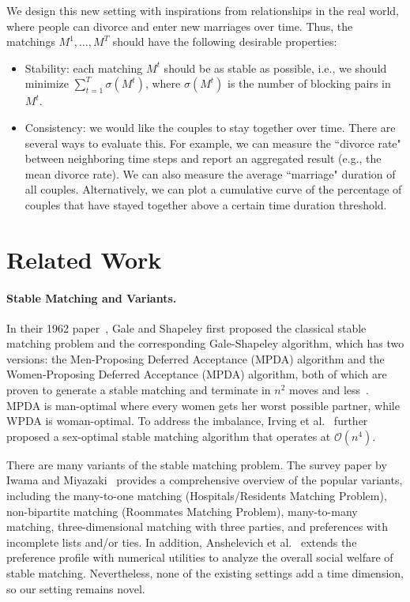 \documentclass{article}
\begin{document}
We design this new setting with inspirations from relationships in the real world, where people can divorce and enter new marriages over time. Thus, the matchings $M^1, \ldots, M^T$ should have the following desirable properties:
\begin{itemize}
    \item Stability: each matching $M^t$ should be as stable as possible, i.e., we should minimize $\sum_{t=1}^T{\sigma(M^t)}$, where $\sigma(M^t)$ is the number of blocking pairs in $M^t$.
    \item Consistency: we would like the couples to stay together over time. There are several ways to evaluate this. For example, we can measure the ``divorce rate" between neighboring time steps and report an aggregated result (e.g., the mean divorce rate). We can also measure the average ``marriage" duration of all couples. Alternatively, we can plot a cumulative curve of the percentage of couples that have stayed together above a certain time duration threshold.
\end{itemize}

\section{Related Work}
\paragraph{Stable Matching and Variants.}
In their 1962 paper~\cite{galeshapley1962}, Gale and Shapeley first proposed the classical stable matching problem and the corresponding
Gale-Shapeley algorithm, which has two versions: the Men-Proposing Deferred Acceptance (MPDA) algorithm and the Women-Proposing Deferred Acceptance (MPDA) algorithm, both of which are proven to generate a stable matching and terminate in $n^2$ moves and less~\cite{irving1989textbook}. MPDA is man-optimal where every women gets her worst possible partner, while WPDA is woman-optimal. To address the imbalance, Irving et al.~\cite{irving1987efficient} further proposed a sex-optimal stable matching algorithm that operates at $\mathcal{O}(n^4)$.

There are many variants of the stable matching problem. The survey paper by Iwama and Miyazaki~\cite{iwama2008survey} provides a comprehensive overview of the popular variants, including the many-to-one matching (Hospitals/Residents Matching Problem), non-bipartite matching (Roommates Matching Problem), many-to-many matching, three-dimensional matching with three parties, and preferences with incomplete lists and/or ties. In addition, Anshelevich et al.~\cite{Anshelevich2013} extends the preference profile with numerical utilities to analyze the overall social welfare of stable matching. Nevertheless, none of the existing settings add a time dimension, so our setting remains novel.
\end{document}
